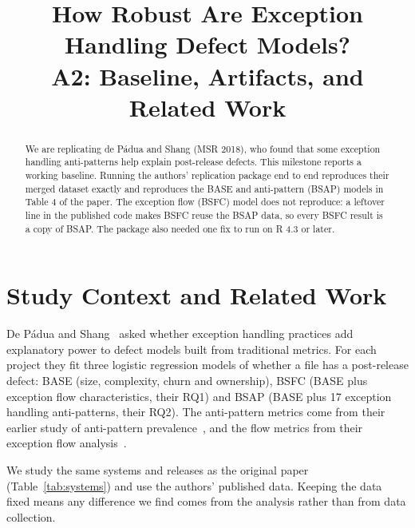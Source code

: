\documentclass[conference]{IEEEtran}
\begin{document}
\sloppy

\title{How Robust Are Exception Handling Defect Models?\\
A2: Baseline, Artifacts, and Related Work}

\author{
}

\maketitle

\begin{abstract}
We are replicating de P\'adua and Shang (MSR 2018), who found that some exception handling anti-patterns help explain post-release defects. This milestone reports a working baseline. Running the authors' replication package end to end reproduces their merged dataset exactly and reproduces the BASE and anti-pattern (BSAP) models in Table 4 of the paper. The exception flow (BSFC) model does not reproduce: a leftover line in the published code makes BSFC reuse the BSAP data, so every BSFC result is a copy of BSAP. The package also needed one fix to run on R 4.3 or later.
\end{abstract}

\section{Study Context and Related Work}
De P\'adua and Shang~\cite{padua2018msr} asked whether exception handling practices add explanatory power to defect models built from traditional metrics. For each project they fit three logistic regression models of whether a file has a post-release defect: BASE (size, complexity, churn and ownership), BSFC (BASE plus exception flow characteristics, their RQ1) and BSAP (BASE plus 17 exception handling anti-patterns, their RQ2). The anti-pattern metrics come from their earlier study of anti-pattern prevalence~\cite{padua2017icpc}, and the flow metrics from their exception flow analysis~\cite{padua2017scam}.

We study the same systems and releases as the original paper (Table~\ref{tab:systems}) and use the authors' published data. Keeping the data fixed means any difference we find comes from the analysis rather than from data collection.
\end{document}
